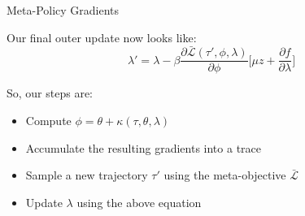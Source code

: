 \documentclass[aspectratio=169]{../latex_main/tntbeamer}  %
\begin{document}
\begin{frame}{Meta-Policy Gradients~}
    
    Our final outer update now looks like:
    \[
        \lambda' = \lambda - \beta \frac{\partial \bar{\mathcal{L}}(\tau', \phi, \lambda)}{\partial \phi} \bigg [ \mu z +  \frac{\partial f}{\partial \lambda} \bigg ]
    \]

    \vfill
    So, our steps are:
    \begin{itemize}
        \item Compute $\phi = \theta +  \kappa(\tau, \theta, \lambda)$
        \item Accumulate the resulting gradients into a trace 
        \item Sample a new trajectory $\tau'$ using the meta-objective $\bar{\mathcal{L}}$
        \item Update $\lambda$ using the above equation 
    \end{itemize}

\end{frame}
\end{document}
